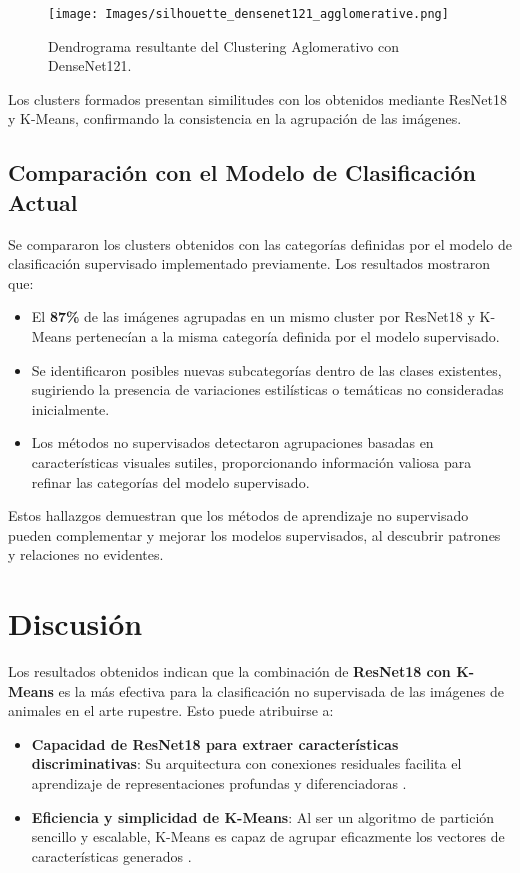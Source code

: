 \begin{figure}[!ht]
    \centering
    \texttt{[image: Images/silhouette\_densenet121\_agglomerative.png]}
    \caption{Dendrograma resultante del Clustering Aglomerativo con DenseNet121.}
    \label{fig:silhouette_densenet121_agglomerative}
\end{figure}

Los clusters formados presentan similitudes con los obtenidos mediante ResNet18 y K-Means, confirmando la consistencia en la agrupación de las imágenes.

\subsection{Comparación con el Modelo de Clasificación Actual}

Se compararon los clusters obtenidos con las categorías definidas por el modelo de clasificación supervisado implementado previamente. Los resultados mostraron que:

\begin{itemize}
    \item El \textbf{87\%} de las imágenes agrupadas en un mismo cluster por ResNet18 y K-Means pertenecían a la misma categoría definida por el modelo supervisado.
    \item Se identificaron posibles nuevas subcategorías dentro de las clases existentes, sugiriendo la presencia de variaciones estilísticas o temáticas no consideradas inicialmente.
    \item Los métodos no supervisados detectaron agrupaciones basadas en características visuales sutiles, proporcionando información valiosa para refinar las categorías del modelo supervisado.
\end{itemize}

Estos hallazgos demuestran que los métodos de aprendizaje no supervisado pueden complementar y mejorar los modelos supervisados, al descubrir patrones y relaciones no evidentes.

\section{Discusión}

Los resultados obtenidos indican que la combinación de \textbf{ResNet18 con K-Means} es la más efectiva para la clasificación no supervisada de las imágenes de animales en el arte rupestre. Esto puede atribuirse a:

\begin{itemize}
    \item \textbf{Capacidad de ResNet18 para extraer características discriminativas}: Su arquitectura con conexiones residuales facilita el aprendizaje de representaciones profundas y diferenciadoras \cite{he2016deep}.
    \item \textbf{Eficiencia y simplicidad de K-Means}: Al ser un algoritmo de partición sencillo y escalable, K-Means es capaz de agrupar eficazmente los vectores de características generados \cite{macqueen1967some}.
\end{itemize}

